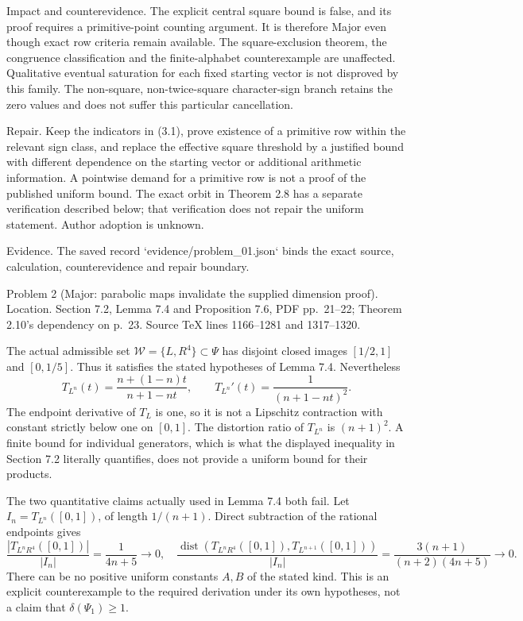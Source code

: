 \documentclass[10pt]{article}
\begin{document}
Impact and counterevidence. The explicit central square bound is false, and its proof requires a primitive-point counting argument. It is therefore Major even though exact row criteria remain available. The square-exclusion theorem, the congruence classification and the finite-alphabet counterexample are unaffected. Qualitative eventual saturation for each fixed starting vector is not disproved by this family. The non-square, non-twice-square character-sign branch retains the zero values and does not suffer this particular cancellation.\par
Repair. Keep the indicators in (3.1), prove existence of a primitive row within the relevant sign class, and replace the effective square threshold by a justified bound with different dependence on the starting vector or additional arithmetic information. A pointwise demand for a primitive row is not a proof of the published uniform bound. The exact orbit in Theorem 2.8 has a separate verification described below; that verification does not repair the uniform statement. Author adoption is unknown.\par
Evidence. The saved record `evidence/problem\_01.json` binds the exact source, calculation, counterevidence and repair boundary.\par
Problem 2 (Major: parabolic maps invalidate the supplied dimension proof).  Location. Section 7.2, Lemma 7.4 and Proposition 7.6, PDF pp. 21–22; Theorem 2.10’s dependency on p. 23. Source TeX lines 1166–1281 and 1317–1320.\par
The actual admissible set \(\mathcal W=\{L,R^4\}\subset\Psi\) has disjoint closed images \([1/2,1]\) and \([0,1/5]\). Thus it satisfies the stated hypotheses of Lemma 7.4. Nevertheless \[T_{L^n}(t)=\frac{n+(1-n)t}{n+1-nt},\qquad
 T_{L^n}'(t)=\frac1{(n+1-nt)^2}.\] The endpoint derivative of \(T_L\) is one, so it is not a Lipschitz contraction with constant strictly below one on \([0,1]\). The distortion ratio of \(T_{L^n}\) is \((n+1)^2\). A finite bound for individual generators, which is what the displayed inequality in Section 7.2 literally quantifies, does not provide a uniform bound for their products.\par
The two quantitative claims actually used in Lemma 7.4 both fail. Let \(I_n=T_{L^n}([0,1])\), of length \(1/(n+1)\). Direct subtraction of the rational endpoints gives \[\frac{|T_{L^nR^4}([0,1])|}{|I_n|}
       =\frac1{4n+5}\longrightarrow0,
\quad
 \frac{\operatorname{dist}
       (T_{L^nR^4}([0,1]),T_{L^{n+1}}([0,1]))}{|I_n|}
       =\frac{3(n+1)}{(n+2)(4n+5)}
       \longrightarrow0.
 \tag{3.2}\] There can be no positive uniform constants \(A,B\) of the stated kind. This is an explicit counterexample to the required derivation under its own hypotheses, not a claim that \(\delta(\Psi_1)\geq1\).\par
\end{document}
